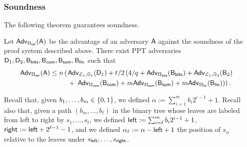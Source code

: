 \subsubsection{Soundness}

The following theorem guarantees soundness. 
 
\begin{theorem} Let \(\mathsf{Adv}_{{\Pi_{\mathsf{set}}}}(\mathsf{A})\) 
be the advantage of an adversary \(\mathsf{A}\) against the soundness of 
the proof system  described above. There exist PPT adversaries
\(\mathsf{D}_1,\mathsf{D}_2,\mathsf{B}_{\mathsf{bits}},\mathsf{B}_{\mathsf{com}},\mathsf{B}_{\mathsf{sum}},\mathsf{B}_\mathsf{lin}\) such that 
\begin{align*}
\mathsf{Adv}_{{\Pi_{\mathsf{set}}}}(\mathsf{A}) \leq 
n \left(\right.
    &\mathsf{Adv}_{\mathcal{L}_1,\mathbb{G}_1}(\mathsf{D}_1) 
        + t /2\left(4/q
            +  \mathsf{Adv}_{\Pi_{\mathsf{bits}}}(\mathsf{B}_{\mathsf{bits}})
            +  \mathsf{Adv}_{\mathcal{L}_1,\mathbb{G}_2}(\mathsf{B}_2)\right. \\
    &+ \left.\left.\mathsf{Adv}_{{\Pi_{\mathsf{com}}}}(\mathsf{B}_{\mathsf{com}})
        + m\mathsf{Adv}_{{\Pi_{\mathsf{sum}}}}(\mathsf{B}_{\mathsf{sum}})
        + m\mathsf{Adv}_{{\Pi_\mathsf{lin}}}(\mathsf{B}_\mathsf{lin})\right)\right).
\end{align*}
\label{teo:bitstr-soundness}
\end{theorem}

Recall that, given $b_1,\ldots,b_m\in\{0,1\}$, we defined $\alpha:=\sum_{i=1}^mb_i2^{i-1}+1$. Recall also that, given a path $(b_m,\ldots, b_\ell)$ in the binary tree whose leaves are labeled from left to right by $s_1,\ldots,s_t$, we defined ${\mathsf{left}}:=\sum_{i=\ell}^m b_i2^{i-1}+1$, ${\mathsf{right}}:={\mathsf{left}}+2^{\ell-1}-1$, and we defined $\alpha_\ell:=\alpha-{\mathsf{left}}+1$ the position of $s_\alpha$ relative to the leaves under $s_{\mathsf{left}},\ldots,s_{\mathsf{right}}$.

